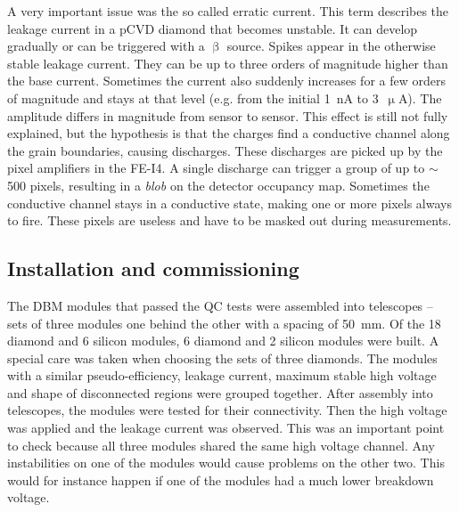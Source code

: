 \documentclass[12pt]{packages/mytustyle}  %
\begin{document}
A very important issue was the so called erratic current. This term describes the leakage current in a pCVD diamond that becomes unstable. It can develop gradually or can be triggered with a $\upbeta$ source. Spikes appear in the otherwise stable leakage current. They can be up to three orders of magnitude higher than the base current. Sometimes the current also suddenly increases for a few orders of magnitude and stays at that level (e.g. from the initial 1~nA to 3~$\upmu$A). The amplitude differs in magnitude from sensor to sensor. This effect is still not fully explained, but the hypothesis is that the charges find a conductive channel along the grain boundaries, causing discharges. These discharges are picked up by the pixel amplifiers in the FE-I4. A single discharge can trigger a group of up to $\sim$500 pixels, resulting in a \emph{blob} on the detector occupancy map. Sometimes the conductive channel stays in a conductive state, making one or more pixels always to fire. These pixels are useless and have to be masked out during measurements. 

\subsection{Installation and commissioning}
The DBM modules that passed the QC tests were assembled into telescopes -- sets of three modules one behind the other with a spacing of 50~mm. Of the 18 diamond and 6 silicon modules, 6 diamond and 2 silicon modules were built. A special care was taken when choosing the sets of three diamonds. The modules with a similar pseudo-efficiency, leakage current, maximum stable high voltage and shape of disconnected regions were grouped together. After assembly into telescopes, the modules were tested for their connectivity. Then the high voltage was applied and the leakage current was observed. This was an important point to check because all three modules shared the same high voltage channel. Any instabilities on one of the modules would cause problems on the other two. This would for instance happen if one of the modules had a much lower breakdown voltage.
\end{document}
